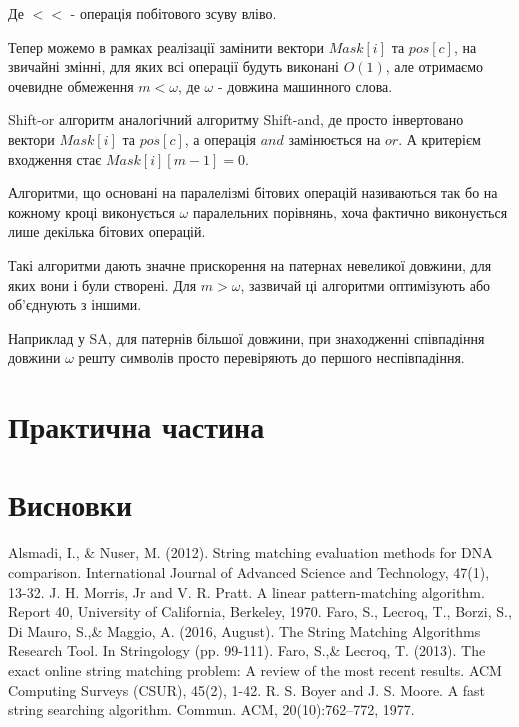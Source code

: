\documentclass[a4paper,14pt]{extarticle} %
\begin{document}
	Де $<<$ - операція побітового зсуву вліво.

	Тепер можемо в рамках реалізації замінити вектори $Mask[i]$ та $pos[c]$, на звичайні змінні, для яких всі операції будуть виконані $O(1)$, але отримаємо очевидне обмеження $m<\omega$, де $\omega$ - довжина машинного слова.

	Shift-or алгоритм аналогічний алгоритму Shift-and, де просто інвертовано вектори $Mask[i]$ та $pos[c]$, а операція $and$ замінюється на $or$. 
	А критерієм входження стає $Mask[i][m-1]=0$.

	Алгоритми, що основані на паралелізмі бітових операцій називаються так бо на кожному кроці виконується $\omega$ паралельних порівнянь, хоча фактично виконується лише декілька бітових операцій.

	Такі алгоритми дають значне прискорення на патернах невеликої довжини, для яких вони і були створені. Для $m>\omega$, зазвичай ці алгоритми оптимізують або об'єднують з іншими.

	Наприклад у SA, для патернів більшої довжини, при знаходженні співпадіння довжини $\omega$ решту символів просто перевіряють до першого неспівпадіння.

    \section{Практична частина}

    \newpage
    \section{Висновки}

    \newpage
    
    \begin{thebibliography}{9}
		Alsmadi, I., \& Nuser, M. (2012). String matching evaluation methods for DNA comparison. International Journal of Advanced Science and Technology, 47(1), 13-32.
		J. H. Morris, Jr and V. R. Pratt. A linear pattern-matching algorithm. Report 40, University of California, Berkeley, 1970.
		Faro, S., Lecroq, T., Borzi, S., Di Mauro, S.,\& Maggio, A. (2016, August). The String Matching Algorithms Research Tool. In Stringology (pp. 99-111).
		Faro, S.,\& Lecroq, T. (2013). The exact online string matching problem: A review of the most recent results. ACM Computing Surveys (CSUR), 45(2), 1-42.
		R. S. Boyer and J. S. Moore. A fast string searching algorithm. Commun.
ACM, 20(10):762–772, 1977.
    \end{thebibliography}
    
\end{document}
